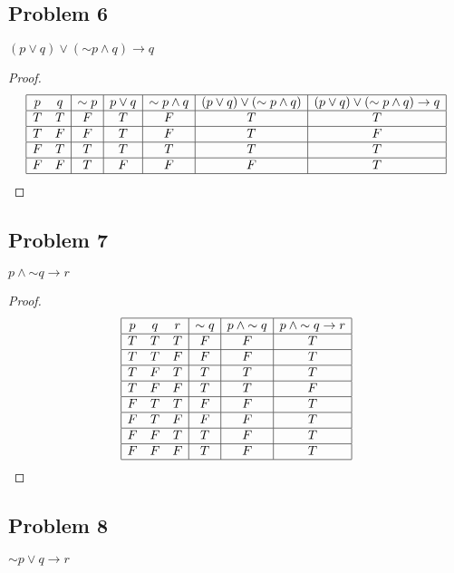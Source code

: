 \documentclass[14pt]{extarticle}
\begin{document}
\subsection{Problem 6}
$(p \vee q) \vee ({\sim p} \wedge q) \to q$

\begin{proof}
$$
\begin{array}{|cc|c|c|c|c|c|}
\hline
p & q & {\sim p} & p \vee q & {\sim p} \wedge q & (p \vee q) \vee ({\sim p}
\wedge q) & (p \vee q) \vee ({\sim p} \wedge q) \to q \\
\hline
T & T & F & T & F & T & T \\
\hline
T & F & F & T & F & T & F \\
\hline
F & T & T & T & T & T & T \\
\hline
F & F & T & F & F & F & T \\
\hline
\end{array}
$$
\end{proof}

\subsection{Problem 7}
$p \wedge {\sim q} \to r$

\begin{proof}
$$
\begin{array}{|ccc|c|c|c|}
\hline
p & q & r & {\sim q} & p \wedge {\sim q} & p \wedge {\sim q} \to r \\
\hline
T & T & T & F & F & T \\
\hline
T & T & F & F & F & T \\
\hline
T & F & T & T & T & T \\
\hline
T & F & F & T & T & F \\
\hline
F & T & T & F & F & T \\
\hline
F & T & F & F & F & T \\
\hline
F & F & T & T & F & T \\
\hline
F & F & F & T & F & T \\
\hline
\end{array}
$$
\end{proof}

\subsection{Problem 8}
${\sim p} \vee q \to r$
\end{document}
